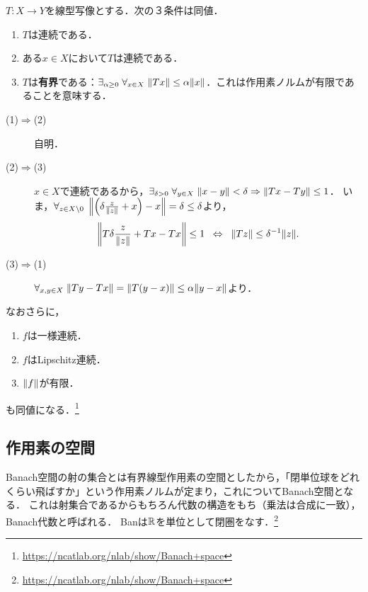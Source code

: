 \documentclass[uplatex,dvipdfmx]{jsreport}
\begin{document}
\begin{proposition}
    $T:X\to Y$を線型写像とする．次の３条件は同値．
    \begin{enumerate}
        \item $T$は連続である．
        \item ある$x\in X$において$T$は連続である．
        \item $T$は\textbf{有界}である：$\exists_{\alpha\ge 0}\;\forall_{x\in X}\;\|Tx\|\le\alpha\|x\|$．これは作用素ノルムが有限であることを意味する．
    \end{enumerate}
\end{proposition}
\begin{Proof}\mbox{}
    \begin{description}
        \item[(1)$\Rightarrow$(2)] 自明．
        \item[(2)$\Rightarrow$(3)] $x\in X$で連続であるから，$\exists_{\delta>0}\;\forall_{y\in X}\;\|x-y\|<\delta\Rightarrow\|Tx-Ty\|\le 1$．
        いま，$\forall_{z\in X\setminus 0}\;\left\|\left(\delta\frac{z}{\|z\|}+x\right)-x\right\|=\delta\le\delta$より，
        \[\left\|T\delta\frac{z}{\|z\|}+Tx-Tx\right\|\le 1\;\;\Leftrightarrow\;\;\|Tz\|\le\delta^{-1}\|z\|.\]
        \item[(3)$\Rightarrow$(1)]
        $\forall_{x,y\in X}\;\|Ty-Tx\|=\|T(y-x)\|\le\alpha\|y-x\|$より．
    \end{description}
\end{Proof}
\begin{remark}
    なおさらに，
    \begin{enumerate}
        \item $f$は一様連続．
        \item $f$はLipschitz連続．
        \item $\|f\|$が有限．
    \end{enumerate}
    も同値になる．\footnote{\url{https://ncatlab.org/nlab/show/Banach+space}}
\end{remark}

\subsection{作用素の空間}

\begin{tcolorbox}[colframe=ForestGreen, colback=ForestGreen!10!white,breakable,colbacktitle=ForestGreen!40!white,coltitle=black,fonttitle=\bfseries\sffamily,
title=Banには内部homを持つ閉圏としての構造がある]
    Banach空間の射の集合とは有界線型作用素の空間としたから，「閉単位球をどれくらい飛ばすか」という作用素ノルムが定まり，これについてBanach空間となる．
    これは射集合であるからもちろん代数の構造をもち（乗法は合成に一致），Banach代数と呼ばれる．
    Banは$\mathbb{R}$を単位として閉圏をなす．\footnote{\url{https://ncatlab.org/nlab/show/Banach+space}}
\end{tcolorbox}
\end{document}
